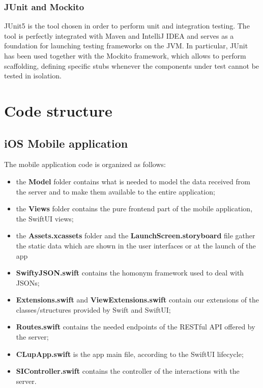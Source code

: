 \documentclass[a4paper,oneside,11pt]{book}
\begin{document}
    \subsection{JUnit and Mockito}
    JUnit5 is the tool chosen in order to perform unit and integration testing. 
    The tool is perfectly integrated with Maven and IntelliJ IDEA and serves as a foundation for launching testing frameworks on the JVM. In particular, JUnit has been used together with the Mockito framework, which allows to perform scaffolding, defining specific stubs whenever the components under test cannot be tested in isolation. 
\chapter{Code structure}
    \section{iOS Mobile application}
    The mobile application code is organized as follows:
    \begin{itemize}
        \item the \textbf{Model} folder contains what is needed to model the data received from the server and to make them available to the entire application;
        \item the \textbf{Views} folder contains the pure frontend part of the mobile application, the SwiftUI views;
        \item the \textbf{Assets.xcassets} folder and the \textbf{LaunchScreen.storyboard} file gather the static data which are shown in the user interfaces or at the launch of the app 
        \item \textbf{SwiftyJSON.swift} contains the homonym framework used to deal with JSONs;
        \item \textbf{Extensions.swift} and \textbf{ViewExtensions.swift} contain our extensions of the classes/structures provided by Swift and SwiftUI;
        \item \textbf{Routes.swift} contains the needed endpoints of the RESTful API offered by the server;
        \item \textbf{CLupApp.swift} is the app main file, according to the SwiftUI lifecycle;
        \item \textbf{SIController.swift} contains the controller of the interactions with the server.
    \end{itemize}
\end{document}
